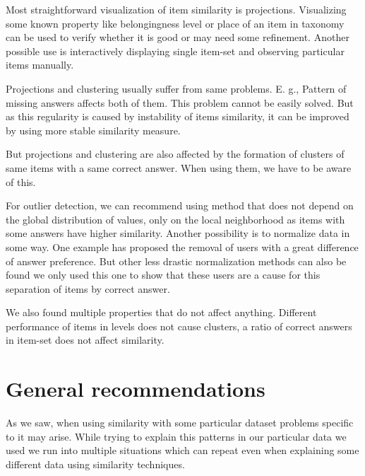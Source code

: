 \documentclass[
  digital, %
  table,   %
  nolof,     %
  nolot,     %
  nocover,
  color,
  final, %
]{fithesis3}
\begin{document}

Most straightforward visualization of item similarity is projections. Visualizing some known property like belongingness level or place of an item in taxonomy can be used to verify whether it is good or may need some refinement. Another possible use is interactively displaying single item-set and observing particular items manually.


Projections and clustering usually suffer from same problems. E. g., Pattern of missing answers affects both of them. This problem cannot be easily solved. But as this regularity is caused by instability of items similarity, it can be improved by using more stable similarity measure.

But projections and clustering are also affected by the formation of clusters of same items with a same correct answer. When using them, we have to be aware of this.


For outlier detection, we can recommend using method that does not depend on the global distribution of values, only on the local neighborhood as items with some answers have higher similarity. Another possibility is to normalize data in some way. One example has proposed the removal of users with a great difference of answer preference. But other less drastic normalization methods can also be found we only used this one to show that these users are a cause for this separation of items by correct answer.


We also found multiple properties that do not affect anything. Different performance of items in levels does not cause clusters, a ratio of correct answers in item-set does not affect similarity. %


\section{General recommendations}\label{general-recommendations}

As we saw, when using similarity with some particular dataset problems specific to it may arise. While trying to explain this patterns in our particular data we used we run into multiple situations which can repeat even when explaining some different data using similarity techniques.
\end{document}
